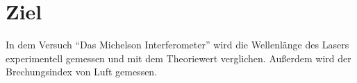 \section{Ziel}
\label{sec:Ziel}

In dem Versuch \enquote{Das Michelson Interferometer} wird die Wellenlänge des Lasers experimentell
gemessen und mit dem Theoriewert verglichen. Außerdem wird der Brechungsindex von Luft gemessen.